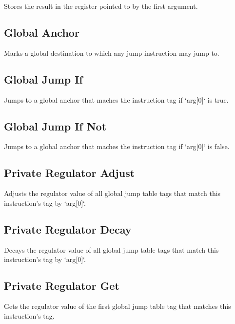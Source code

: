 Stores the result in the register pointed to by the first argument.

\subsection{Global Anchor}


Marks a global destination to which any jump instruction may jump to.

\subsection{Global Jump If}


Jumps to a global anchor that maches the instruction tag if `arg[0]` is true.

\subsection{Global Jump If Not}


Jumps to a global anchor that maches the instruction tag if `arg[0]` is false.

\subsection{Private Regulator Adjust}


Adjusts the regulator value of all global jump table tags that match this instruction's tag by `arg[0]`.

\subsection{Private Regulator Decay}


Decays the regulator value of all global jump table tags that match this instruction's tag by `arg[0]`.

\subsection{Private Regulator Get}


Gets the regulator value of the first global jump table tag that matches this instruction's tag.

